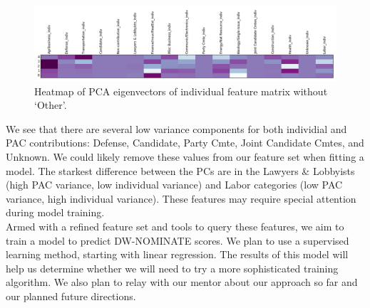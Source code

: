 \documentclass[10]{article}
\begin{document}
\begin{figure}[H]
\centering
\includegraphics[width=.9\textwidth]{../../data/features/visualize/pcs_no_other_indiv.png}
\caption{\label{fig:pc_indiv}Heatmap of PCA eigenvectors of individual feature matrix without `Other'.}
\end{figure}
We see that there are several low variance components for both individial and PAC contributions: Defense, Candidate, Party Cmte, Joint Candidate Cmtes, and Unknown.  We could likely remove these values from our feature set when fitting a model.  The starkest difference between the PCs are in the Lawyers \& Lobbyists (high PAC variance, low individual variance) and Labor categories (low PAC variance, high individual variance).  These features may require special attention during model training. \\

Armed with a refined feature set and tools to query these features, we aim to train a model to predict DW-NOMINATE scores.  We plan to use a supervised learning method, starting with linear regression.  The results of this model will help us determine whether we will need to try a more sophisticated training algorithm.  We also plan to relay with our mentor about our approach so far and our planned future directions. 
\end{document}
